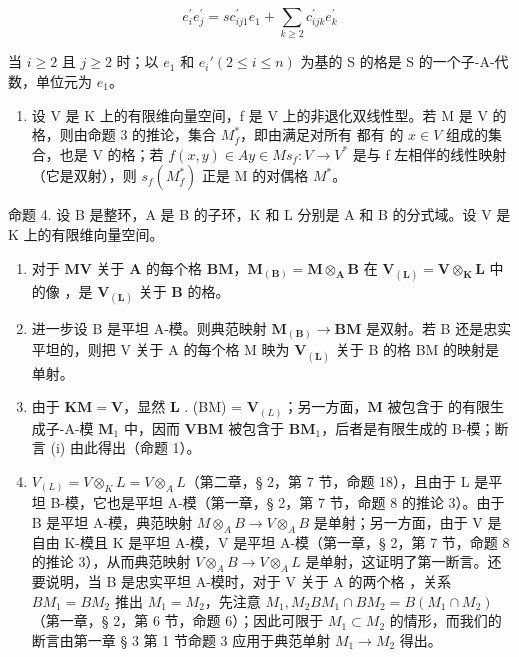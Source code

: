 \[
e _ {i} ^ {\prime} e _ {j} ^ {\prime} = s c _ {i j 1} ^ {\prime} e _ {1} + \sum_ {k \geqslant 2} c _ {i j k} ^ {\prime} e _ {k} ^ {\prime}
\]

当 \(i \geqslant 2\) 且 \(j \geqslant 2\) 时；以 \(e_1\) 和 \(e_i' (2 \leqslant i \leqslant n)\) 为基的 S 的格是 S 的一个子-A-代数，单位元为 \(e_1\)。

\begin{enumerate}
\def\labelenumi{(\arabic{enumi})}
\setcounter{enumi}{4}
\tightlist
\item
  设 V 是 K 上的有限维向量空间，f 是 V 上的非退化双线性型。若 M 是 V 的格，则由命题 3 的推论，集合 \(M_{f}^{*}\)，即由满足对所有  都有  的 \(x \in V\) 组成的集合，也是 V 的格；若 \(f(x, y) \in A\)\(y \in M\)\(s_{f}: V \to V^{*}\) 是与 f 左相伴的线性映射（它是双射），则 \(s_{f}(M_{f}^{*})\) 正是 M 的对偶格 \(M^{*}\)。
\end{enumerate}

命题 4. 设 B 是整环，A 是 B 的子环，K 和 L 分别是 A 和 B 的分式域。设 V 是 K 上的有限维向量空间。

\begin{enumerate}
\def\labelenumi{(\roman{enumi})}
\item
  对于 \(\mathbf{M}\)\(\mathbf{V}\) 关于 \(\mathbf{A}\) 的每个格 \(\mathbf{BM}\)，\(\mathbf{M}_{(\mathbf{B})} = \mathbf{M} \otimes_{\mathbf{A}} \mathbf{B}\) 在 \(\mathbf{V}_{(\mathbf{L})} = \mathbf{V} \otimes_{\mathbf{K}} \mathbf{L}\) 中的像 ，是 \(\mathbf{V}_{(\mathbf{L})}\) 关于 \(\mathbf{B}\) 的格。
\item
  进一步设 B 是平坦 A-模。则典范映射 \(\mathbf{M}_{(\mathbf{B})}\to\mathbf{BM}\) 是双射。若 B 还是忠实平坦的，则把 V 关于 A 的每个格 M 映为 \(\mathbf{V}_{(\mathbf{L})}\) 关于 B 的格 BM 的映射是单射。
\item
  由于 \(\mathbf{KM} = \mathbf{V}\)，显然 \(\mathbf{L}\) . (BM) = \(\mathbf{V}_{(L)}\)；另一方面，\(\mathbf{M}\) 被包含于  的有限生成子-A-模 \(\mathbf{M}_1\) 中，因而 \(\mathbf{V}\)\(\mathbf{BM}\) 被包含于 \(\mathbf{BM}_1\)，后者是有限生成的 B-模；断言 (i) 由此得出（命题 1）。
\item
  \(V_{(L)} = V \otimes_{K} L = V \otimes_{A} L\)（第二章，§ 2，第 7 节，命题 18），且由于 L 是平坦 B-模，它也是平坦 A-模（第一章，§ 2，第 7 节，命题 8 的推论 3）。由于 B 是平坦 A-模，典范映射 \(M \otimes_{A} B \to V \otimes_{A} B\) 是单射；另一方面，由于 V 是自由 K-模且 K 是平坦 A-模，V 是平坦 A-模（第一章，§ 2，第 7 节，命题 8 的推论 3），从而典范映射 \(V \otimes_{A} B \to V \otimes_{A} L\) 是单射，这证明了第一断言。还要说明，当 B 是忠实平坦 A-模时，对于 V 关于 A 的两个格 ，关系 \(BM_{1} = BM_{2}\) 推出 \(M_{1} = M_{2}\)，先注意 \(M_{1}, M_{2}\)\(BM_{1} \cap BM_{2} = B(M_{1} \cap M_{2})\)（第一章，§ 2，第 6 节，命题 6）；因此可限于 \(M_{1} \subset M_{2}\) 的情形，而我们的断言由第一章 § 3 第 1 节命题 3 应用于典范单射 \(M_{1} \to M_{2}\) 得出。
\end{enumerate}

